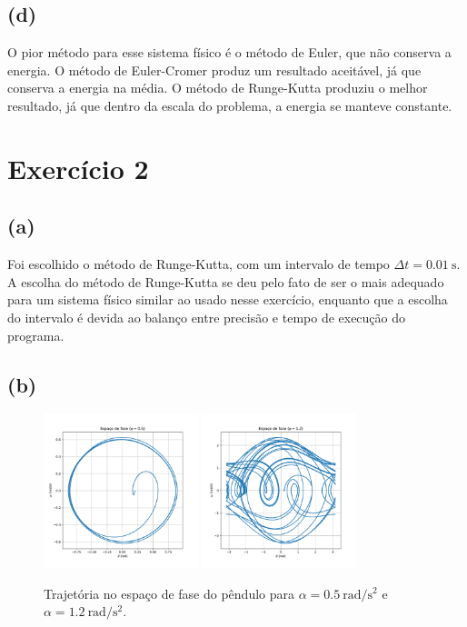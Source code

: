 \documentclass[a4paper, brazil]{article}
\begin{document}
\subsection{(d)}

O pior método para esse sistema físico é o método de Euler, que não conserva a energia.
O método de Euler-Cromer produz um resultado aceitável, já que conserva a energia na média.
O método de Runge-Kutta produziu o melhor resultado, já que dentro da escala do problema, a energia se manteve constante.

\newpage
\section{Exercício 2}

\subsection{(a)}

Foi escolhido o método de Runge-Kutta, com um intervalo de tempo \( \Delta t = \SI{0.01}{\second} \).
A escolha do método de Runge-Kutta se deu pelo fato de ser o mais adequado para um sistema físico similar ao usado nesse exercício, enquanto que a escolha do intervalo é devida ao balanço entre precisão e tempo de execução do programa.

\subsection{(b)}

\begin{figure}[ht]
\centering
\includegraphics[width=0.4\textwidth]{fig2b1.pdf}
\includegraphics[width=0.4\textwidth]{fig2b2.pdf}
\caption{Trajetória no espaço de fase do pêndulo para \( \alpha = \SI{0.5}{\radian\per\second\squared} \) e \( \alpha = \SI{1.2}{\radian\per\second\squared} \).}
\label{fig2b}
\end{figure}
\end{document}
